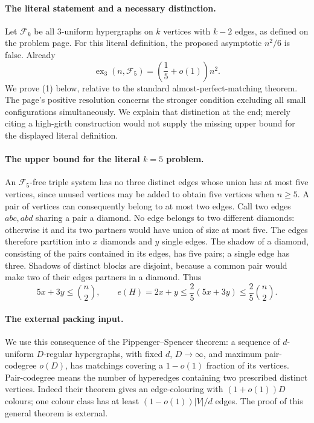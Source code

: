 \paragraph{The literal statement and a necessary distinction.}
Let \(\mathcal F_k\) be all \(3\)-uniform hypergraphs on \(k\) vertices with \(k-2\) edges, as defined on the problem page. For this literal definition, the proposed asymptotic \(n^2/6\) is false. Already
\[
 \operatorname{ex}_3(n,\mathcal F_5)
 =\left(\frac15+o(1)\right)n^2.
 \tag{1}
\]
We prove (1) below, relative to the standard almost-perfect-matching theorem. The page's positive resolution concerns the stronger condition excluding all small configurations simultaneously. We explain that distinction at the end; merely citing a high-girth construction would not supply the missing upper bound for the displayed literal definition.

\paragraph{The upper bound for the literal \(k=5\) problem.}
An \(\mathcal F_5\)-free triple system has no three distinct edges whose union has at most five vertices, since unused vertices may be added to obtain five vertices when \(n\geq5\). A pair of vertices can consequently belong to at most two edges.
Call two edges \(abc,abd\) sharing a pair a diamond. No edge belongs to two different diamonds: otherwise it and its two partners would have union of size at most five. The edges therefore partition into \(x\) diamonds and \(y\) single edges.
The shadow of a diamond, consisting of the pairs contained in its edges, has five pairs; a single edge has three. Shadows of distinct blocks are disjoint, because a common pair would make two of their edges partners in a diamond. Thus
\[
 5x+3y\leq\binom n2,\qquad
 e(H)=2x+y\leq\frac25(5x+3y)
 \leq\frac25\binom n2.
 \tag{2}
\]

\paragraph{The external packing input.}
We use this consequence of the Pippenger--Spencer theorem: a sequence of \(d\)-uniform \(D\)-regular hypergraphs, with fixed \(d\), \(D\to\infty\), and maximum pair-codegree \(o(D)\), has matchings covering a \(1-o(1)\) fraction of its vertices. Pair-codegree means the number of hyperedges containing two prescribed distinct vertices. Indeed their theorem gives an edge-colouring with \((1+o(1))D\) colours; one colour class has at least \((1-o(1))|V|/d\) edges. The proof of this general theorem is external.

